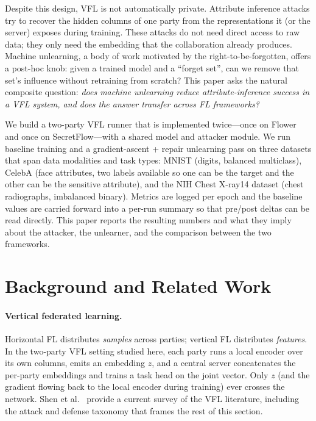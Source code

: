 \documentclass[letterpaper,twocolumn,10pt]{article}
\begin{document}
Despite this design, VFL is not automatically private. Attribute inference
attacks try to recover the hidden columns of one party from the
representations it (or the server) exposes during training. These attacks
do not need direct access to raw data; they only need the embedding that
the collaboration already produces. Machine unlearning, a body of work
motivated by the right-to-be-forgotten, offers a post-hoc knob: given a
trained model and a ``forget set'', can we remove that set's influence
without retraining from scratch? This paper asks the natural composite
question: \emph{does machine unlearning reduce attribute-inference
success in a VFL system, and does the answer transfer across FL
frameworks?}

We build a two-party VFL runner that is implemented twice---once on Flower
and once on SecretFlow---with a shared model and attacker module. We run
baseline training and a gradient-ascent + repair unlearning pass on three
datasets that span data modalities and task types: MNIST (digits, balanced
multiclass), CelebA (face attributes, two labels available so one can be
the target and the other can be the sensitive attribute), and the NIH Chest
X-ray14 dataset (chest radiographs, imbalanced binary). Metrics are logged
per epoch and the baseline values are carried forward into a per-run summary
so that pre/post deltas can be read directly. This paper reports the
resulting numbers and what they imply about the attacker, the unlearner,
and the comparison between the two frameworks.

\section{Background and Related Work}

\paragraph{Vertical federated learning.}
Horizontal FL distributes \emph{samples} across parties; vertical FL
distributes \emph{features}. In the two-party VFL setting studied here,
each party runs a local encoder over its own columns, emits an embedding
$z$, and a central server concatenates the per-party embeddings and trains
a task head on the joint vector. Only $z$ (and the gradient flowing back
to the local encoder during training) ever crosses the network. Shen et
al.~\cite{shen2024survey} provide a current survey of the VFL
literature, including the attack and defense taxonomy that frames the
rest of this section.
\end{document}
